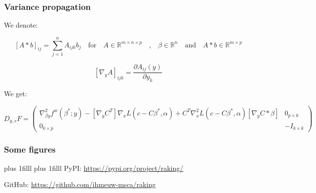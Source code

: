 \documentclass[aspectratio=169]{beamer}
\newcommand{\btVFill}{\vskip0pt plus 1filll}
\begin{document}
\begin{frame}
	\frametitle{Variance propagation}
	We denote:

	\begin{equation*}
	\left[ A * b \right]_{ij} = \sum_{j = 1}^n A_{ijk} b_j \quad \text{for} \quad A \in \mathbb{R}^{m \times n \times p} \quad \text{,} \quad \beta \in \mathbb{R}^n \quad \text{and} \quad A * b \in \mathbb{R}^{m \times p}
	\end{equation*}

	\begin{equation*}
	\left[ \nabla_y A \right]_{ijk} = \frac{\partial A_{ij} \left( y \right)}{\partial y_k}
	\end{equation*}

	We get:

	\begin{equation*}
	D_{y , s} F = \begin{pmatrix} \nabla^2_{\beta y} f^w \left( \beta^* ; y \right) - \left[ \nabla_y C^T \right] \nabla_x L \left( c - C \beta^* , \alpha \right) + C^T \nabla_x^2 L \left( c - C \beta^* , \alpha \right) \left[ \nabla_y C * \beta \right] & 0_{p \times k} \\ 0_{k \times p} & - I_{k \times k} \end{pmatrix}
	\end{equation*}
\end{frame}

\begin{frame}
	\frametitle{Some figures}
\end{frame}

\begin{frame}
\btVFill
{}
\btVFill
PyPI: \href{https://pypi.org/project/raking/}{https://pypi.org/project/raking/}

GitHub: \href{https://github.com/ihmeuw-msca/raking}{https://github.com/ihmeuw-msca/raking}
\end{frame}
\end{document}
